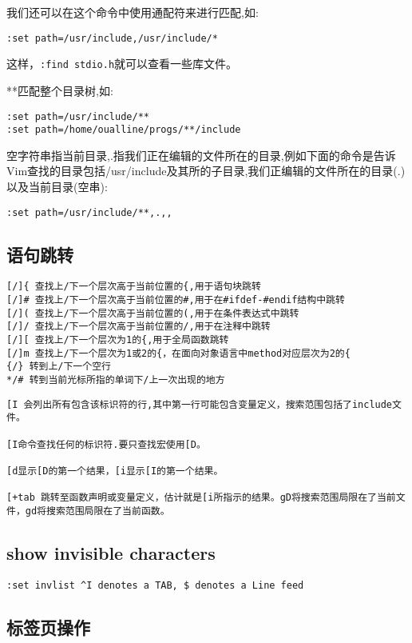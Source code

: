 我们还可以在这个命令中使用通配符来进行匹配,如:
\begin{verbatim}
:set path=/usr/include,/usr/include/*
\end{verbatim}
这样，\verb+:find stdio.h+就可以查看一些库文件。

**匹配整个目录树,如:
\begin{verbatim}
:set path=/usr/include/**
:set path=/home/oualline/progs/**/include
\end{verbatim}
空字符串指当前目录,.指我们正在编辑的文件所在的目录,例如下面的命令是告诉Vim查找的目录包括/usr/include及其所的子目录,我们正编辑的文件所在的目录(.)以及当前目录(空串):
\begin{verbatim}
:set path=/usr/include/**,.,,
\end{verbatim}

\subsection{语句跳转}
\begin{verbatim}
[/]{ 查找上/下一个层次高于当前位置的{,用于语句块跳转
[/]# 查找上/下一个层次高于当前位置的#,用于在#ifdef-#endif结构中跳转
[/]( 查找上/下一个层次高于当前位置的(,用于在条件表达式中跳转
[/]/ 查找上/下一个层次高于当前位置的/,用于在注释中跳转
[/][ 查找上/下一个层次为1的{,用于全局函数跳转
[/]m 查找上/下一个层次为1或2的{，在面向对象语言中method对应层次为2的{
{/} 转到上/下一个空行
*/# 转到当前光标所指的单词下/上一次出现的地方
\end{verbatim}


\begin{verbatim}
[I 会列出所有包含该标识符的行,其中第一行可能包含变量定义，搜索范围包括了include文件。

[I命令查找任何的标识符.要只查找宏使用[D。

[d显示[D的第一个结果，[i显示[I的第一个结果。

[+tab 跳转至函数声明或变量定义，估计就是[i所指示的结果。gD将搜索范围局限在了当前文件，gd将搜索范围局限在了当前函数。
\end{verbatim}

\subsection{show invisible characters}
\begin{verbatim}
:set invlist ^I denotes a TAB, $ denotes a Line feed
\end{verbatim}

\subsection{标签页操作}

